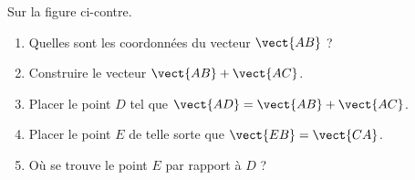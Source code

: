 
\begin{exercice}\label{exosmath-0697}


\begin{wrapfigure}{r}{6.0cm}
   \vspace{-0.5cm}        %
   \centering
   
\end{wrapfigure}

    Sur la figure ci-contre.

    \begin{enumerate}
        \item
            Quelles sont les coordonnées du vecteur \( \vect{ AB }\) ?
        \item
            Construire le vecteur \( \vect{ AB }+\vect{ AC }\).
        \item
            Placer le point \( D\) tel que \( \vect{ AD }=\vect{ AB }+\vect{ AC }\).
        \item
            Placer le point \( E\) de telle sorte que \( \vect{ EB }=\vect{ CA }\).
        \item
            Où se trouve le point \( E\) par rapport à \( D\) ?
    \end{enumerate}

\end{exercice}
